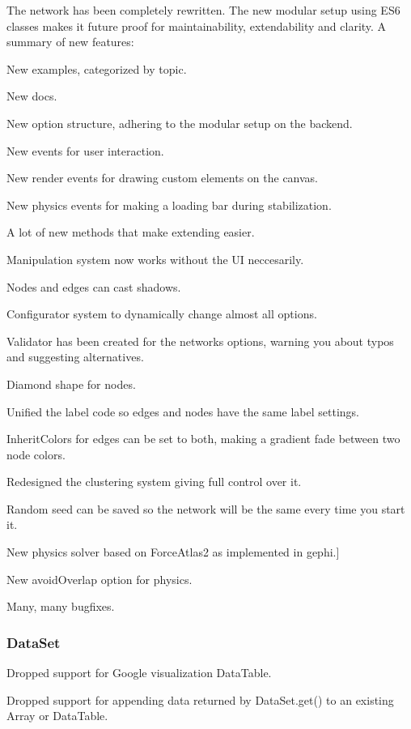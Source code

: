 The network has been completely rewritten. The new modular setup using E\+S6 classes makes it future proof for maintainability, extendability and clarity. A summary of new features\+:
\begin{DoxyItemize}
\item New examples, categorized by topic.
\item New docs.
\item New option structure, adhering to the modular setup on the backend.
\item New events for user interaction.
\item New render events for drawing custom elements on the canvas.
\item New physics events for making a loading bar during stabilization.
\item A lot of new methods that make extending easier.
\item Manipulation system now works without the UI neccesarily.
\item Nodes and edges can cast shadows.
\item Configurator system to dynamically change almost all options.
\item Validator has been created for the network\textquotesingle{}s options, warning you about typo\textquotesingle{}s and suggesting alternatives.
\item Diamond shape for nodes.
\item Unified the label code so edges and nodes have the same label settings.
\item Inherit\+Colors for edges can be set to both, making a gradient fade between two node colors.
\item Redesigned the clustering system giving full control over it.
\item Random seed can be saved so the network will be the same every time you start it.
\item New physics solver based on Force\+Atlas2 as implemented in gephi.\mbox{]}
\item New avoid\+Overlap option for physics.
\item Many, many bugfixes.
\end{DoxyItemize}

\subsubsection*{Data\+Set}


\begin{DoxyItemize}
\item Dropped support for Google visualization Data\+Table.
\item Dropped support for appending data returned by {\ttfamily Data\+Set.\+get()} to an existing Array or Data\+Table.
\end{DoxyItemize}

